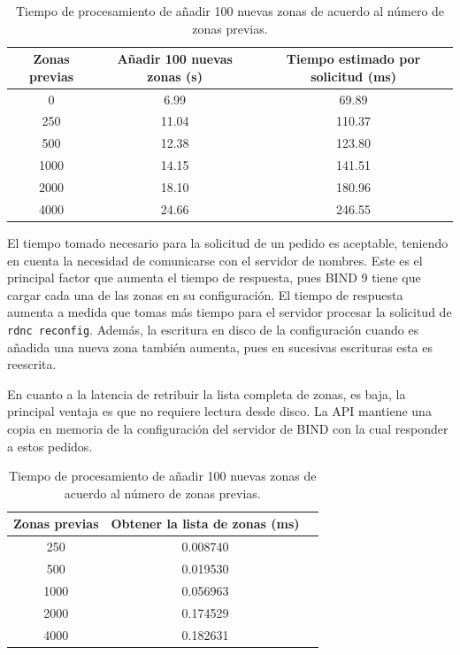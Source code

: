 \begin{table}[!ht]
    \centering
    \begin{tabular}{|c|c|c|}
    \hline
    \multicolumn{1}{|p{4cm}|}{\centering\textbf{Zonas previas}} & \multicolumn{1}{|p{4cm}|}{\centering \textbf{Añadir 100 nuevas zonas (s)}} & \multicolumn{1}{|p{4cm}|}{\centering \textbf{Tiempo estimado por solicitud (ms)}} \\ \hline
        0 & 6.99 & 69.89 \\ \hline
        250 & 11.04 & 110.37 \\ \hline
        500 & 12.38 & 123.80 \\ \hline
        1000 & 14.15 & 141.51 \\ \hline
        2000 & 18.10 & 180.96 \\ \hline
        4000 & 24.66 & 246.55 \\ \hline
    \end{tabular}
    \caption{Tiempo de procesamiento de añadir 100 nuevas zonas de acuerdo al número de zonas previas.}
\end{table}

El tiempo tomado necesario para la solicitud de un pedido es aceptable, teniendo en cuenta la necesidad de comunicarse con el servidor de nombres. Este es el principal factor que aumenta el tiempo de respuesta, pues BIND 9 tiene que cargar cada una de las zonas en su configuración. El tiempo de respuesta aumenta a medida que tomas más tiempo para el servidor procesar la solicitud de \verb|rdnc reconfig|. Además, la escritura en disco de la configuración cuando es añadida una nueva zona también aumenta, pues en sucesivas escrituras esta es reescrita.

En cuanto a la latencia de retribuir la lista completa de zonas, es baja, la principal ventaja es que no requiere lectura desde disco. La API mantiene una copia en memoria de la configuración del servidor de BIND con la cual responder a estos pedidos.

\begin{table}[!ht]
    \centering
    \begin{tabular}{|c|c|c|}
    \hline
    \multicolumn{1}{|p{4cm}|}{\centering\textbf{Zonas previas}} & \multicolumn{1}{|p{7cm}|}{\centering \textbf{Obtener la lista de zonas (ms)}} \\ \hline
        250  & 0.008740  \\ \hline
        500  & 0.019530  \\ \hline
        1000 & 0.056963  \\ \hline
        2000 & 0.174529  \\ \hline
        4000 & 0.182631  \\ \hline
    \end{tabular}
    \caption{Tiempo de procesamiento de añadir 100 nuevas zonas de acuerdo al número de zonas previas.}
\end{table}

